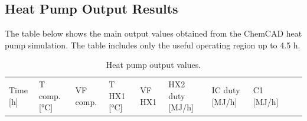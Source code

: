 \subsection{Heat Pump Output Results}\label{heat-pump-output-results}

The table below shows the main output values obtained from the ChemCAD
heat pump simulation. The table includes only the useful operating
region up to 4.5 h.

\begin{longtable}[]{@{}
  >{\raggedleft\arraybackslash}p{}
  >{\raggedleft\arraybackslash}p{}
  >{\raggedleft\arraybackslash}p{}
  >{\raggedleft\arraybackslash}p{}
  >{\raggedleft\arraybackslash}p{}
  >{\raggedleft\arraybackslash}p{}
  >{\raggedleft\arraybackslash}p{}
  >{\raggedleft\arraybackslash}p{}
  >{\raggedleft\arraybackslash}p{}
  >{\raggedleft\arraybackslash}p{}@{}}
\caption{Heat pump output values.
\label{tab:Heat pump output values}}\tabularnewline
\toprule\noalign{}
\begin{minipage}[b]{\linewidth}\raggedleft
Time {[}h{]}
\end{minipage} & \begin{minipage}[b]{\linewidth}\raggedleft
T comp. {[}°C{]}
\end{minipage} & \begin{minipage}[b]{\linewidth}\raggedleft
VF comp.
\end{minipage} & \begin{minipage}[b]{\linewidth}\raggedleft
T HX1 {[}°C{]}
\end{minipage} & \begin{minipage}[b]{\linewidth}\raggedleft
VF HX1
\end{minipage} & \begin{minipage}[b]{\linewidth}\raggedleft
HX2 duty {[}MJ/h{]}
\end{minipage} & \begin{minipage}[b]{\linewidth}\raggedleft
IC duty {[}MJ/h{]}
\end{minipage} & \begin{minipage}[b]{\linewidth}\raggedleft
C1 {[}MJ/h{]}

\end{minipage}
\end{longtable}
